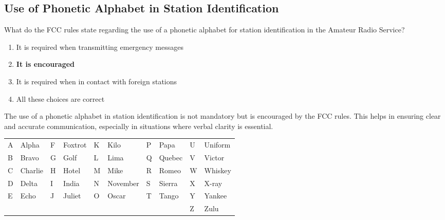 \subsection{Use of Phonetic Alphabet in Station Identification}
\label{T1A03}

\begin{tcolorbox}[colback=gray!10!white,colframe=black!75!black,title=T1A03]
What do the FCC rules state regarding the use of a phonetic alphabet for station identification in the Amateur Radio Service?
\begin{enumerate}[label=\Alph*,noitemsep]
    \item It is required when transmitting emergency messages
    \item \textbf{It is encouraged}
    \item It is required when in contact with foreign stations
    \item All these choices are correct
\end{enumerate}
\end{tcolorbox}

The use of a phonetic alphabet in station identification is not mandatory but is encouraged by the FCC rules. This helps in ensuring clear and accurate communication, especially in situations where verbal clarity is essential.


\begin{center}
    \begin{tcolorbox}[title=NATO Phonetic Alphabet,colback=white]
    \begin{tabular}{|l|l|l|l|l|l|l|l|l|l|}
    \hline
    A & Alpha & F & Foxtrot & K & Kilo & P & Papa & U & Uniform \\
    B & Bravo & G & Golf & L & Lima & Q & Quebec & V & Victor \\
    C & Charlie & H & Hotel & M & Mike & R & Romeo & W & Whiskey \\ 
    D & Delta & I & India & N & November & S & Sierra & X & X-ray \\
    E & Echo & J & Juliet & O & Oscar & T & Tango & Y & Yankee \\
                                             &        &  &        &  &        &  &        & Z & Zulu \\
    \hline
    \end{tabular}
    \end{tcolorbox}
    \end{center}